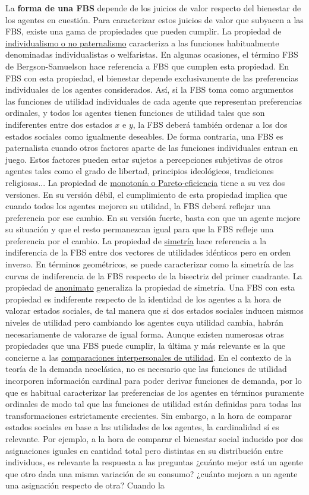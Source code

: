 \documentclass{nuevotema}
\begin{document}
La \textbf{forma de una FBS} depende de los juicios de valor respecto del bienestar de los agentes en cuestión. Para caracterizar estos juicios de valor que subyacen a las FBS, existe una gama de propiedades que pueden cumplir. La propiedad de \underline{individualismo o no paternalismo} caracteriza a las funciones habitualmente denominadas individualistas o welfaristas. En algunas ocasiones, el término FBS de Bergson-Samuelson hace referencia a FBS que cumplen esta propiedad. En FBS con esta propiedad, el bienestar depende exclusivamente de las preferencias individuales de los agentes considerados. Así, si la FBS toma como argumentos las funciones de utilidad individuales de cada agente que representan preferencias ordinales, y todos los agentes tienen funciones de utilidad tales que son indiferentes entre dos estados $x$ e $y$, la FBS deberá también ordenar a los dos estados sociales como igualmente deseables. De forma contraria, una FBS es paternalista cuando otros factores aparte de las funciones individuales entran en juego. Estos factores pueden estar sujetos a percepciones subjetivas de otros agentes tales como el grado de libertad, principios ideológicos, tradiciones religiosas... La propiedad de \underline{monotonía o Pareto-eficiencia} tiene a su vez dos versiones. En su versión débil, el cumplimiento de esta propiedad implica que cuando todos los agentes mejoren su utilidad, la FBS deberá reflejar una preferencia por ese cambio. En su versión fuerte, basta con que un agente mejore su situación y que el resto permanezcan igual para que la FBS refleje una preferencia por el cambio. La propiedad de \underline{simetría} hace referencia a la indiferencia de la FBS entre dos vectores de utilidades idénticos pero en orden inverso. En términos geométricos, se puede caracterizar como la simetría de las curvas de indiferencia de la FBS respecto de la bisectriz del primer cuadrante. La propiedad de \underline{anonimato} generaliza la propiedad de simetría. Una FBS con esta propiedad es indiferente respecto de la identidad de los agentes a la hora de valorar estados sociales, de tal manera que si dos estados sociales inducen mismos niveles de utilidad pero cambiando los agentes cuya utilidad cambia, habrán necesariamente de valorarse de igual forma. Aunque existen numerosas otras propiedades que una FBS puede cumplir, la última y más relevante es la que concierne a las \underline{comparaciones interpersonales de utilidad}. En el contexto de la teoría de la demanda neoclásica, no es necesario que las funciones de utilidad incorporen información cardinal para poder derivar funciones de demanda, por lo que es habitual caracterizar las preferencias de los agentes en términos puramente ordinales de modo tal que las funciones de utilidad están definidas para todas las transformaciones estrictamente crecientes. Sin embargo, a la hora de comparar estados sociales en base a las utilidades de los agentes, la cardinalidad sí es relevante. Por ejemplo, a la hora de comparar el bienestar social inducido por dos asignaciones iguales en cantidad total pero distintas en su distribución entre individuos, es relevante la respuesta a las preguntas ¿cuánto mejor está un agente que otro dada una misma variación de su consumo? ¿cuánto mejora a un agente una asignación respecto de otra? Cuando la 
\end{document}
